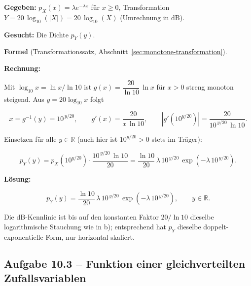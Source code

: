\begin{beispiel}[Funktion einer Zufallsvariablen -- $Y = 20\log_{10}(|X|)$]

\textbf{Gegeben:} $p_X(x) = \lambda e^{-\lambda x}$ für $x \geq 0$,
Transformation $Y = 20\,\log_{10}(|X|) = 20\,\log_{10}(X)$ (Umrechnung in dB).

\textbf{Gesucht:} Die Dichte $p_Y(y)$.

\textbf{Formel} (Transformationssatz, Abschnitt~\ref{sec:monotone-transformation}).

\textbf{Rechnung:}

Mit $\log_{10} x = \ln x / \ln 10$ ist $g(x) = \dfrac{20}{\ln 10}\,\ln x$ für
$x > 0$ streng monoton steigend. Aus $y = 20\log_{10}x$ folgt

$$
x = g^{-1}(y) = 10^{\,y/20}, \qquad
g'(x) = \frac{20}{x\,\ln 10}, \qquad
\left|g'\!\left(10^{y/20}\right)\right| = \frac{20}{10^{\,y/20}\,\ln 10}.
$$

Einsetzen für alle $y \in \mathbb{R}$ (auch hier ist $10^{y/20} > 0$ stets im
Träger):

$$
p_Y(y) = p_X\!\left(10^{y/20}\right) \cdot \frac{10^{\,y/20}\,\ln 10}{20}
       = \frac{\ln 10}{20}\,\lambda\, 10^{\,y/20}\,
         \exp\!\left(-\lambda\, 10^{\,y/20}\right).
$$

\textbf{Lösung:}

$$
\boxed{\;p_Y(y) = \frac{\ln 10}{20}\,\lambda\, 10^{\,y/20}\,
\exp\!\left(-\lambda\, 10^{\,y/20}\right), \qquad y \in \mathbb{R}.\;}
$$

Die dB-Kennlinie ist bis auf den konstanten Faktor $20/\ln 10$ dieselbe
logarithmische Stauchung wie in b); entsprechend hat $p_Y$ dieselbe
doppelt-exponentielle Form, nur horizontal skaliert.

\end{beispiel}

\subsection*{Aufgabe 10.3 – Funktion einer gleichverteilten Zufallsvariablen}

